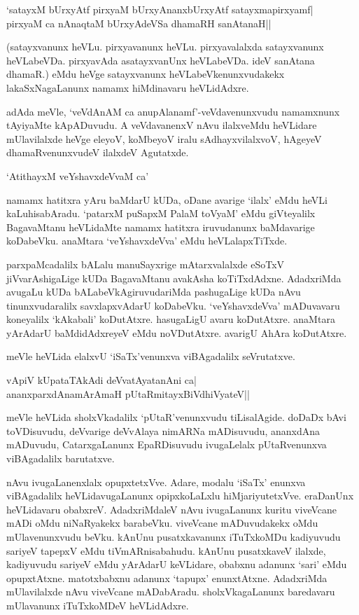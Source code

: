 \begin{shloka}
`satayxM bUrxyAtf pirxyaM bUrxyAnanxbUrxyAtf satayxmapirxyamf|\\
pirxyaM ca nAnaqtaM bUrxyAdeVSa dhamaRH sanAtanaH||
\end{shloka}

(satayxvanunx heVLu. pirxyavanunx heVLu. pirxyavalalxda satayxvanunx heVLabeVDa. pirxyavAda asatayxvanUnx heVLabeVDa. ideV sanAtana dhamaR.) eMdu heVge satayxvanunx heVLabeVkenunxvudakekx lakaSxNagaLanunx namamx hiMdinavaru heVLidAdxre.

adAda meVle, `veVdAnAM ca anupAlanamf'-veVdavenunxvudu namamxnunx tAyiyaMte kApADuvudu. A veVdavanenxV nAvu ilalxveMdu heVLidare mUlavilalxde heVge eleyoV, koMbeyoV iralu sAdhayxvilalxvoV, hAgeyeV dhamaRvenunxvudeV ilalxdeV Agutatxde.

\begin{shloka}
`AtithayxM veYshavxdeVvaM ca'
\end{shloka}

namamx hatitxra yAru baMdarU kUDa, oDane avarige `ilalx' eMdu heVLi kaLuhisabAradu. `patarxM puSapxM PalaM toVyaM' eMdu giVteyalilx BagavaMtanu heVLidaMte namamx hatitxra iruvudanunx baMdavarige koDabeVku. anaMtara `veYshavxdeVva' eMdu heVLalapxTiTxde.

parxpaMcadalilx bALalu manuSayxrige mAtarxvalalxde eSoTxV jiVvarAshigaLige kUDa BagavaMtanu avakAsha koTiTxdAdxne. AdadxriMda avugaLu kUDa bALabeVkAgiruvudariMda pashugaLige kUDa nAvu tinunxvudaralilx savxlapxvAdarU koDabeVku. `veYshavxdeVva' mADuvavaru koneyalilx `kAkabali' koDutAtxre. hasugaLigU avaru koDutAtxre. anaMtara yArAdarU baMdidAdxreyeV eMdu noVDutAtxre. avarigU AhAra koDutAtxre.

meVle heVLida elalxvU `iSaTx'venunxva viBAgadalilx seVrutatxve.

\begin{shloka}
vApiV kUpataTAkAdi deVvatAyatanAni ca|\\
ananxparxdAnamArAmaH pUtaRmitayxBiVdhiVyateV||
\end{shloka}

meVle heVLida sholxVkadalilx `pUtaR'venunxvudu tiLisalAgide. doDaDx bAvi toVDisuvudu, deVvarige deVvAlaya nimARNa mADisuvudu, ananxdAna mADuvudu, CatarxgaLanunx EpaRDisuvudu ivugaLelalx pUtaRvenunxva viBAgadalilx barutatxve.

nAvu ivugaLanenxlalx opupxtetxVve. Adare, modalu `iSaTx' enunxva viBAgadalilx heVLidavugaLanunx opipxkoLaLxlu hiMjariyutetxVve. eraDanUnx heVLidavaru obabxreV. AdadxriMdaleV nAvu ivugaLanunx kuritu viveVcane mADi oMdu niNaRyakekx barabeVku. viveVcane mADuvudakekx oMdu mUlavenunxvudu beVku. kAnUnu pusatxkavanunx iTuTxkoMDu kadiyuvudu sariyeV tapepxV eMdu tiVmARnisabahudu. kAnUnu pusatxkaveV ilalxde, kadiyuvudu sariyeV eMdu yArAdarU keVLidare, obabxnu adanunx `sari' eMdu opupxtAtxne. matotxbabxnu adanunx `tapupx' enunxtAtxne. AdadxriMda mUlavilalxde nAvu viveVcane mADabAradu. sholxVkagaLanunx baredavaru mUlavanunx iTuTxkoMDeV heVLidAdxre.

